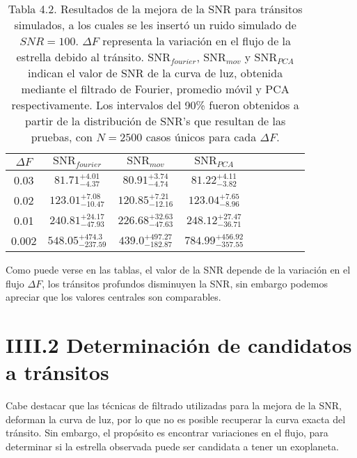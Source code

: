 \begin{table}
	\hspace{-1.7cm}
	\begin{footnotesize}
	\begin{tabular}{ccccccccc}
	\hline 
	$\Delta F$ & $\mbox{SNR}_{fourier}$ &  $\mbox{SNR}_{mov}$ & $\mbox{SNR}_{PCA}$\\ 
	\hline
	0.03 & 	${81.71}_{-4.37}^{+4.01}$ & ${80.91}_{-4.74}^{+3.74}$ & ${81.22}_{-3.82}^{+4.11}$ \\
	0.02 &  ${123.01}_{-10.47}^{+7.08}$ & ${120.85}_{-12.16}^{+7.21}$ & ${123.04}_{-8.96}^{+7.65}$ \\
	0.01 & ${240.81}_{-47.93}^{+24.17}$ & ${226.68}_{-47.63}^{+32.63}$ & ${248.12}_{-36.71}^{+27.47}$ \\
	0.002 & ${548.05}_{-237.59}^{+474.3}$ & ${439.0}_{-182.87}^{+497.27}$ & ${784.99}_{-357.55}^{+456.92}$ \\
	\hline 
	\end{tabular} 
	\end{footnotesize}
	\caption{Tabla 4.2. Resultados de la mejora de la SNR para tránsitos simulados, a los cuales se les insertó un ruido simulado de $SNR=100$. $\Delta F$ representa la variación en el flujo de la estrella debido al tránsito. $\mbox{SNR}_{fourier}$, $\mbox{SNR}_{mov}$ y $\mbox{SNR}_{PCA}$ indican el valor de SNR de la curva de luz, obtenida mediante el filtrado de Fourier, promedio móvil y PCA respectivamente. Los intervalos del 90\% fueron obtenidos a partir de la distribución de SNR's que resultan de las pruebas, con $N=2500$ casos únicos para cada $\Delta F$.}
	\end{table}

Como puede verse en las tablas, el valor de la SNR depende de la variación en el flujo $\Delta F$, los tránsitos profundos disminuyen la SNR, sin embargo podemos apreciar que los valores centrales son comparables.

\section*{IIII.2 Determinación de candidatos a tránsitos}

Cabe destacar que las técnicas de filtrado utilizadas para la mejora de la SNR, deforman la curva de luz, por lo que no es posible recuperar la curva exacta del tránsito. Sin embargo, el propósito es encontrar variaciones en el flujo, para determinar si la estrella observada puede ser candidata a tener un exoplaneta.

